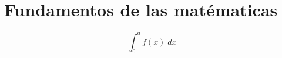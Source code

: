 \chapter{Fundamentos de las matématicas} %
\label{cha:fundamentos-de-las-matematicas}


\begin{equation}
	\int_{0}^{a} f(x) \; d x 
\end{equation}

